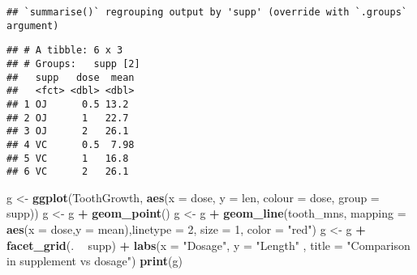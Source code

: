 \documentclass[
]{article}
\newenvironment{Shaded}{\begin{snugshade}}{\end{snugshade}}
\newcommand{\DataTypeTok}[1]{\textcolor[rgb]{0.13,0.29,0.53}{#1}}
\newcommand{\DecValTok}[1]{\textcolor[rgb]{0.00,0.00,0.81}{#1}}
\newcommand{\KeywordTok}[1]{\textcolor[rgb]{0.13,0.29,0.53}{\textbf{#1}}}
\newcommand{\NormalTok}[1]{#1}
\newcommand{\OperatorTok}[1]{\textcolor[rgb]{0.81,0.36,0.00}{\textbf{#1}}}
\newcommand{\StringTok}[1]{\textcolor[rgb]{0.31,0.60,0.02}{#1}}
\begin{document}
\begin{Shaded}
\end{Shaded}

\begin{verbatim}
## `summarise()` regrouping output by 'supp' (override with `.groups` argument)
\end{verbatim}

\begin{verbatim}
## # A tibble: 6 x 3
## # Groups:   supp [2]
##   supp   dose  mean
##   <fct> <dbl> <dbl>
## 1 OJ      0.5 13.2 
## 2 OJ      1   22.7 
## 3 OJ      2   26.1 
## 4 VC      0.5  7.98
## 5 VC      1   16.8 
## 6 VC      2   26.1
\end{verbatim}

\begin{Shaded}
\begin{Highlighting}[]
\NormalTok{g <-}\StringTok{ }\KeywordTok{ggplot}\NormalTok{(ToothGrowth, }\KeywordTok{aes}\NormalTok{(}\DataTypeTok{x =}\NormalTok{ dose, }\DataTypeTok{y =}\NormalTok{ len, }\DataTypeTok{colour =}\NormalTok{ dose, }\DataTypeTok{group =}\NormalTok{ supp))}
\NormalTok{g <-}\StringTok{ }\NormalTok{g }\OperatorTok{+}\StringTok{ }\KeywordTok{geom_point}\NormalTok{()}
\NormalTok{g <-}\StringTok{ }\NormalTok{g }\OperatorTok{+}\StringTok{ }\KeywordTok{geom_line}\NormalTok{(tooth_mns, }\DataTypeTok{mapping =} \KeywordTok{aes}\NormalTok{(}\DataTypeTok{x =}\NormalTok{ dose,}\DataTypeTok{y =}\NormalTok{ mean),}\DataTypeTok{linetype =} \DecValTok{2}\NormalTok{, }\DataTypeTok{size =} \DecValTok{1}\NormalTok{, }\DataTypeTok{color =} \StringTok{"red"}\NormalTok{) }
\NormalTok{g <-}\StringTok{ }\NormalTok{g }\OperatorTok{+}\StringTok{ }\KeywordTok{facet_grid}\NormalTok{(. }\OperatorTok{~}\StringTok{ }\NormalTok{supp) }\OperatorTok{+}\StringTok{ }\KeywordTok{labs}\NormalTok{(}\DataTypeTok{x =} \StringTok{"Dosage"}\NormalTok{, }\DataTypeTok{y =} \StringTok{"Length"}\NormalTok{ , }\DataTypeTok{title =} \StringTok{"Comparison in supplement vs dosage"}\NormalTok{)}
\KeywordTok{print}\NormalTok{(g)}
\end{Highlighting}
\end{Shaded}
\end{document}
